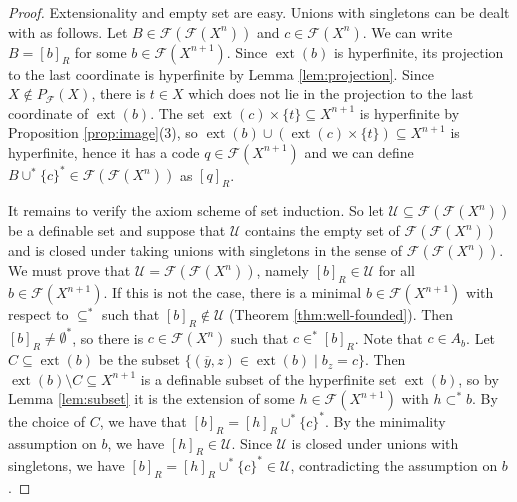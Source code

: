 \documentclass{amsart}
\newcommand{\ca}{\mathcal}
\newcommand{\nin}{\not \in}
\theoremstyle{plain}
\theoremstyle{definition}
\newcommand{\ins}{\in^*}
\newcommand{\F}{\mathcal{F}}
\newcommand{\pF}{P_{\ca F}}
\newcommand{\ext}[1]{\operatorname{ext}(#1)}
\begin{document}
\begin{proof}
Extensionality and empty set are easy. Unions with singletons can be dealt with as follows. Let $B\in \F(\F(X^n))$ and $c \in \F(X^n)$. 
We can write $B = [b]_R$ for some $b \in \F(X^{n+1})$. Since $\ext b$ is hyperfinite, its projection to the last coordinate is hyperfinite by Lemma \ref{lem:projection}. Since $X \notin \pF(X)$, there is $t \in X$ which does not lie in the projection to the last coordinate of $\ext b$. The set $\ext c \times \{t\} \subseteq X^{n+1}$ is hyperfinite by Proposition \ref{prop:image}(3), so $\ext b \cup (\ext c \times \{t\}) \subseteq X^{n+1}$ is hyperfinite, hence it has a code $q \in \mathcal{F}(X^{n+1})$ and we can define $B \cup^* \{c\}^* \in \F(\F(X^n))$ as $[q]_R$. 

It remains to verify the axiom scheme of set induction. So let $\ca U\subseteq \F(\F(X^n))$ be a definable set and suppose that $\ca U$ contains the empty set of $\F(\F(X^n))$ and is closed under taking unions with singletons in the sense of $\F(\F(X^n))$. We must prove that $\ca U = \F(\F(X^n))$, namely $[b]_R \in \ca U$ for all $b\in \F(X^{n+1})$. If this is not the case, there is a minimal $b\in \F(X^{n+1})$ with respect to $\subseteq^*$ such that $[b]_R\nin \ca U$ (Theorem \ref{thm:well-founded}). Then $[b]_R\neq \emptyset^*$, so there is $c\in \F(X^n)$ such that $c\ins [b]_R$. Note that $c\in A_b$. Let $C \subseteq \ext b$ be the subset $\{(\overline{y},z) \in \ext b  \mid b_z=c\}$. Then $\ext b \setminus C \subseteq X^{n+1}$ is a definable subset of the hyperfinite set $\ext b$, so by Lemma \ref{lem:subset} it is the extension of some $h\in \F(X^{n+1})$ with $h \subset^* b$. By the choice of $C$, we have that $[b]_R=[h]_R \cup^* \{c\}^*$. By the minimality assumption on $b$, we have $[h]_R \in \ca U$. Since $\ca U$ is closed under unions with singletons, we have $[b]_R = [h]_R \cup^* \{c\}^* \in \ca U$, contradicting the assumption on $b$. 



\end{proof}
\end{document}
